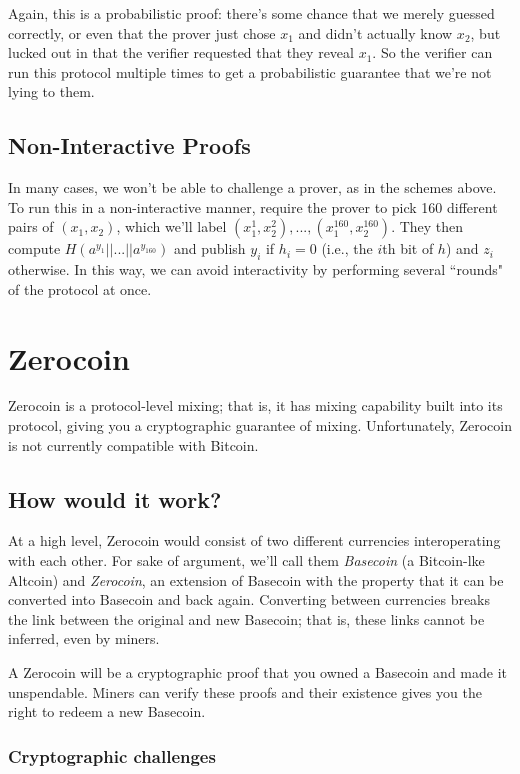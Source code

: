 \documentclass[12pt]{article}
\begin{document}
Again, this is a probabilistic proof: there's some chance that we merely guessed correctly, or even that the prover just chose $x_1$ and didn't actually know $x_2$, but lucked out in that the verifier requested that they reveal $x_1$. So the verifier can run this protocol multiple times to get a probabilistic guarantee that we're not lying to them.

\subsection*{Non-Interactive Proofs}

In many cases, we won't be able to challenge a prover, as in the schemes above. To run this in a non-interactive manner, require the prover to pick 160 different pairs of $(x_1, x_2)$, which we'll label $(x^1_1, x^2_2), ..., (x_1^{160}, x_2^{160})$. They then compute $H(a^{y_1} || ... || a^{y_{160}})$ and publish $y_i$ if $h_i = 0$ (i.e., the $i$th bit of $h$) and $z_i$ otherwise. In this way, we can avoid interactivity by performing several ``rounds" of the protocol at once.

\section*{Zerocoin}

Zerocoin is a protocol-level mixing; that is, it has mixing capability built into its protocol, giving you a cryptographic guarantee of mixing. Unfortunately, Zerocoin is not currently compatible with Bitcoin.

\subsection*{How would it work?}

At a high level, Zerocoin would consist of two different currencies interoperating with each other. For sake of argument, we'll call them \textit{Basecoin} (a Bitcoin-lke Altcoin) and \textit{Zerocoin}, an extension of Basecoin with the property that it can be converted into Basecoin and back again. Converting between currencies breaks the link between the original and new Basecoin; that is, these links cannot be inferred, even by miners.

A Zerocoin will be a cryptographic proof that you owned a Basecoin and made it unspendable. Miners can verify these proofs and their existence gives you the right to redeem a new Basecoin.

\subsubsection*{Cryptographic challenges}
\end{document}
